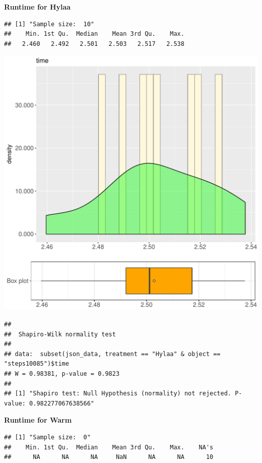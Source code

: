 \documentclass{article}\usepackage[]{graphicx}\usepackage[]{color}
\makeatletter
\def\maxwidth{ %
  \ifdim\Gin@nat@width>\linewidth
    \linewidth
  \else
    \Gin@nat@width
  \fi
}
\newenvironment{kframe}{%
 \def\at@end@of@kframe{}%
 \ifinner\ifhmode%
  \def\at@end@of@kframe{\end{minipage}}%
  \begin{minipage}{\columnwidth}%
 \fi\fi%
 \def\FrameCommand##1{\hskip\@totalleftmargin \hskip-\fboxsep
 \colorbox{shadecolor}{##1}\hskip-\fboxsep
     \hskip-\linewidth \hskip-\@totalleftmargin \hskip\columnwidth}%
 \MakeFramed {\advance\hsize-\width
   \@totalleftmargin\z@ \linewidth\hsize
   \@setminipage}}%
 {\par\unskip\endMakeFramed%
 \at@end@of@kframe}
\newenvironment{knitrout}{}{} %
\makeatother
\begin{document}
 \textbf{Runtime for Hylaa}
\begin{knitrout}
\color{fgcolor}\begin{kframe}
\begin{verbatim}
## [1] "Sample size:  10"
##    Min. 1st Qu.  Median    Mean 3rd Qu.    Max. 
##   2.460   2.492   2.501   2.503   2.517   2.538
\end{verbatim}
\end{kframe}
\includegraphics[width=\maxwidth]{figure/RH1_Hylaa_steps10085-1} 
\begin{kframe}\begin{verbatim}
## 
## 	Shapiro-Wilk normality test
## 
## data:  subset(json_data, treatment == "Hylaa" & object == "steps10085")$time
## W = 0.98381, p-value = 0.9823
## 
## [1] "Shapiro test: Null Hypothesis (normality) not rejected. P-value: 0.982277067638566"
\end{verbatim}
\end{kframe}
\end{knitrout}
 \textbf{Runtime for Warm}
\begin{knitrout}
\color{fgcolor}\begin{kframe}
\begin{verbatim}
## [1] "Sample size:  0"
##    Min. 1st Qu.  Median    Mean 3rd Qu.    Max.    NA's 
##      NA      NA      NA     NaN      NA      NA      10
\end{verbatim}
\end{kframe}
\end{knitrout}
  
\end{document}

